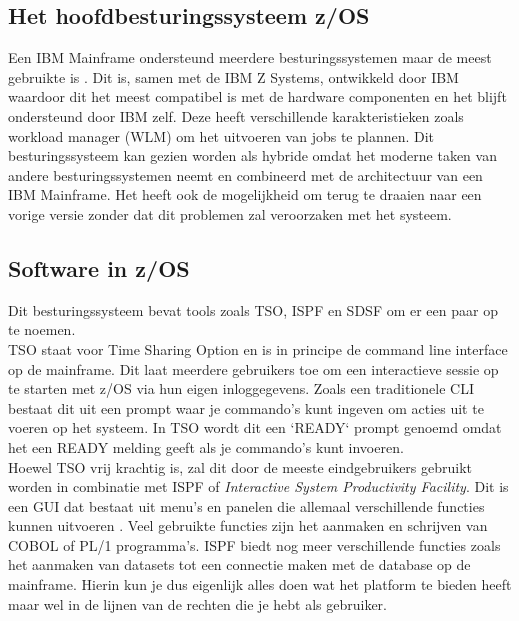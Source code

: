 \subsection{Het hoofdbesturingssysteem z/OS}
Een IBM Mainframe ondersteund meerdere besturingssystemen maar de meest gebruikte is . Dit is, samen met de IBM Z Systems, ontwikkeld door IBM waardoor dit het meest compatibel is met de hardware componenten en het blijft ondersteund door IBM zelf. Deze heeft verschillende karakteristieken zoals workload manager (WLM) om het uitvoeren van jobs te plannen. Dit besturingssysteem kan gezien worden als hybride omdat het moderne taken van andere besturingssystemen neemt en combineerd met de architectuur van een IBM Mainframe. Het heeft ook de mogelijkheid om terug te draaien naar een vorige versie zonder dat dit problemen zal veroorzaken met het systeem. \autocite{Rupp2022} 

\subsection{Software in z/OS}
Dit besturingssysteem bevat tools zoals TSO, ISPF en SDSF om er een paar op te noemen. \\

TSO staat voor Time Sharing Option en is in principe de command line interface op de mainframe. Dit laat meerdere gebruikers toe om een interactieve sessie op te starten met z/OS via hun eigen inloggegevens. Zoals een traditionele CLI bestaat dit uit een prompt waar je commando's kunt ingeven om acties uit te voeren op het systeem. In TSO wordt dit een `READY` prompt genoemd omdat het een READY melding geeft als je commando's kunt invoeren. \autocite{IBM} \\

Hoewel TSO vrij krachtig is, zal dit door de meeste eindgebruikers gebruikt worden in combinatie met ISPF of \textit{Interactive System Productivity Facility}. Dit is een GUI dat bestaat uit menu's en panelen die allemaal verschillende functies kunnen uitvoeren \autocite{IBM}. Veel gebruikte functies zijn het aanmaken en schrijven van COBOL of PL/1 programma's. ISPF biedt nog meer verschillende functies zoals het aanmaken van datasets tot een connectie maken met de database op de mainframe. Hierin kun je dus eigenlijk alles doen wat het platform te bieden heeft maar wel in de lijnen van de rechten die je hebt als gebruiker. \\

